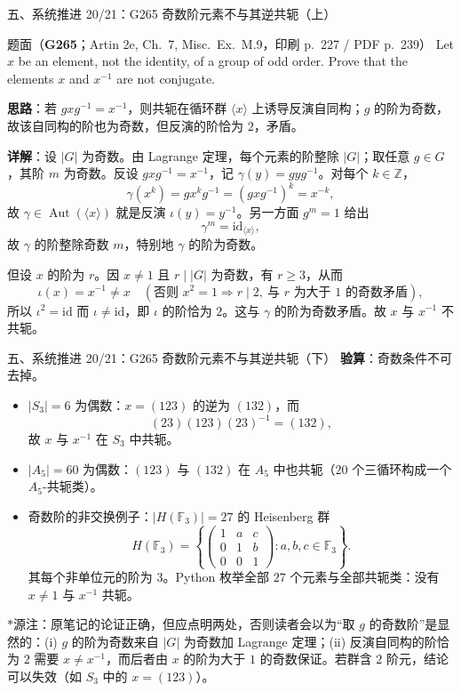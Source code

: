 \documentclass[aspectratio=169,10pt,fontset=none]{ctexbeamer}
\newcommand{\ex}[1]{\textcolor{accent}{\footnotesize\bfseries #1}}
\newcommand{\key}[1]{\textcolor{ink}{\bfseries #1}}
\newcommand{\starpt}{\textcolor{accent}{\bfseries$\ast$}}
\begin{document}
\begin{frame}[t]{五、系统推进 20/21：G265 奇数阶元素不与其逆共轭（上）}
\label{ex:G265}
\scriptsize
\begin{block}{\footnotesize 题面（\ex{G265}；Artin 2e, Ch.~7, Misc.\ Ex.~M.9，印刷 p.~227 / PDF p.~239）}
Let $x$ be an element, not the identity, of a group of odd order. Prove that the elements $x$ and $x^{-1}$ are not conjugate.
\end{block}
\key{思路}：若 $gxg^{-1}=x^{-1}$，则共轭在循环群 $\langle x\rangle$ 上诱导反演自同构；$g$ 的阶为奇数，故该自同构的阶也为奇数，但反演的阶恰为 $2$，矛盾。

\key{详解}：设 $|G|$ 为奇数。由 Lagrange 定理，每个元素的阶整除 $|G|$；取任意 $g\in G$，其阶 $m$ 为奇数。反设 $gxg^{-1}=x^{-1}$，记 $\gamma(y)=gyg^{-1}$。对每个 $k\in\mathbb Z$，
\[ \gamma(x^k)=gx^kg^{-1}=(gxg^{-1})^k=x^{-k}, \]
故 $\gamma\in\operatorname{Aut}(\langle x\rangle)$ 就是反演 $\iota(y)=y^{-1}$。另一方面 $g^m=1$ 给出
\[ \gamma^m=\mathrm{id}_{\langle x\rangle}, \]
故 $\gamma$ 的阶整除奇数 $m$，特别地 $\gamma$ 的阶为奇数。

但设 $x$ 的阶为 $r$。因 $x\ne1$ 且 $r\mid|G|$ 为奇数，有 $r\ge3$，从而
\[ \iota(x)=x^{-1}\ne x\quad(\text{否则 }x^2=1\Rightarrow r\mid2,\ \text{与 }r\text{ 为大于 }1\text{ 的奇数矛盾}), \]
所以 $\iota^2=\mathrm{id}$ 而 $\iota\ne\mathrm{id}$，即 $\iota$ 的阶恰为 $2$。这与 $\gamma$ 的阶为奇数矛盾。故 $x$ 与 $x^{-1}$ 不共轭。
\end{frame}

\begin{frame}[t]{五、系统推进 20/21：G265 奇数阶元素不与其逆共轭（下）}
\scriptsize
\key{验算}：奇数条件不可去掉。
\begin{itemize}
\item $|S_3|=6$ 为偶数：$x=(123)$ 的逆为 $(132)$，而
\[ (23)(123)(23)^{-1}=(132), \]
故 $x$ 与 $x^{-1}$ 在 $S_3$ 中共轭。
\item $|A_5|=60$ 为偶数：$(123)$ 与 $(132)$ 在 $A_5$ 中也共轭（$20$ 个三循环构成一个 $A_5$-共轭类）。
\item 奇数阶的非交换例子：$|H(\mathbb F_3)|=27$ 的 Heisenberg 群
\[ H(\mathbb F_3)=\left\{\begin{pmatrix}1&a&c\\0&1&b\\0&0&1\end{pmatrix}:a,b,c\in\mathbb F_3\right\}. \]
其每个非单位元的阶为 $3$。Python 枚举全部 $27$ 个元素与全部共轭类：没有 $x\ne1$ 与 $x^{-1}$ 共轭。
\end{itemize}

\starpt 源注：原笔记的论证正确，但应点明两处，否则读者会以为“取 $g$ 的奇数阶”是显然的：(i) $g$ 的阶为奇数来自 $|G|$ 为奇数加 Lagrange 定理；(ii) 反演自同构的阶恰为 $2$ 需要 $x\ne x^{-1}$，而后者由 $x$ 的阶为大于 $1$ 的奇数保证。若群含 $2$ 阶元，结论可以失效（如 $S_3$ 中的 $x=(123)$）。
\end{frame}
\end{document}
